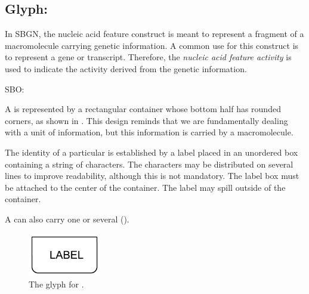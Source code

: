 \subsection{Glyph: }
\label{sec:af:genetic}

In SBGN, the nucleic acid feature construct is meant to represent a fragment of a macromolecule carrying genetic information.  A common use for this construct is to represent a gene or transcript.  Therefore, the \emph{nucleic acid feature activity} is used to indicate the activity derived from the genetic information.

\begin{glyphDescription}

\glyphSboTerm SBO:

\glyphContainer A  is represented by a rectangular container whose bottom half has rounded corners, as shown in . This design reminds that we are fundamentally dealing with a unit of information, but this information is carried by a macromolecule.

\glyphLabel The identity of a particular  is established by a label placed in an unordered box containing a string of characters.  The characters may be distributed on several lines to improve readability, although this is not mandatory.  The label box must be attached to the center of the container.  The label may spill outside of the container.

A  can also carry one or several  ().

\end{glyphDescription}

\begin{figure}[H]
  \centering
  \includegraphics[width = 1.25in]{images/genetic-plain}
  \caption{The \AF glyph for .}
  \label{fig:af:genetic}
\end{figure} 